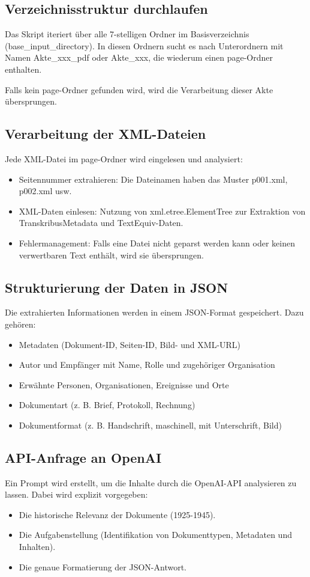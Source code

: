 \documentclass{article}
\begin{document}
\subsection{Verzeichnisstruktur durchlaufen}
Das Skript iteriert über alle 7-stelligen Ordner im Basisverzeichnis (base\_input\_directory). In diesen Ordnern sucht es nach Unterordnern mit Namen Akte\_xxx\_pdf oder Akte\_xxx, die wiederum einen page-Ordner enthalten.

Falls kein page-Ordner gefunden wird, wird die Verarbeitung dieser Akte übersprungen.

\subsection{Verarbeitung der XML-Dateien}
Jede XML-Datei im page-Ordner wird eingelesen und analysiert:
\begin{itemize}
\item Seitennummer extrahieren: Die Dateinamen haben das Muster p001.xml, p002.xml usw.
\item XML-Daten einlesen: Nutzung von xml.etree.ElementTree zur Extraktion von TranskribusMetadata und TextEquiv-Daten.
\item Fehlermanagement: Falls eine Datei nicht geparst werden kann oder keinen verwertbaren Text enthält, wird sie übersprungen.
\end{itemize}

\subsection{Strukturierung der Daten in JSON}
Die extrahierten Informationen werden in einem JSON-Format gespeichert. Dazu gehören:
\begin{itemize}
\item Metadaten (Dokument-ID, Seiten-ID, Bild- und XML-URL)
\item Autor und Empfänger mit Name, Rolle und zugehöriger Organisation
\item Erwähnte Personen, Organisationen, Ereignisse und Orte
\item Dokumentart (z. B. Brief, Protokoll, Rechnung)
\item Dokumentformat (z. B. Handschrift, maschinell, mit Unterschrift, Bild)
\end{itemize}

\subsection{API-Anfrage an OpenAI}
Ein Prompt wird erstellt, um die Inhalte durch die OpenAI-API analysieren zu lassen. Dabei wird explizit vorgegeben:
\begin{itemize}
\item Die historische Relevanz der Dokumente (1925-1945).
\item Die Aufgabenstellung (Identifikation von Dokumenttypen, Metadaten und Inhalten).
\item Die genaue Formatierung der JSON-Antwort.
\end{itemize}
\end{document}
